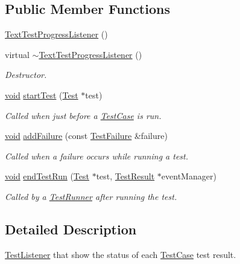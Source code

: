 \subsection*{Public Member Functions}
\begin{DoxyCompactItemize}
\item 
\hyperlink{class_text_test_progress_listener_aa63f5f3bc8a8dffef5c3d3e7dcad8355}{Text\-Test\-Progress\-Listener} ()
\item 
virtual \hyperlink{class_text_test_progress_listener_a28e80d641b47e53a73e896cce622a2fe}{$\sim$\-Text\-Test\-Progress\-Listener} ()
\begin{DoxyCompactList}\small\item\em Destructor. \end{DoxyCompactList}\item 
\hyperlink{wglew_8h_aeea6e3dfae3acf232096f57d2d57f084}{void} \hyperlink{class_text_test_progress_listener_ae5089aa6b0bcae0128604691f23ed224}{start\-Test} (\hyperlink{class_test}{Test} $\ast$test)
\begin{DoxyCompactList}\small\item\em Called when just before a \hyperlink{class_test_case}{Test\-Case} is run. \end{DoxyCompactList}\item 
\hyperlink{wglew_8h_aeea6e3dfae3acf232096f57d2d57f084}{void} \hyperlink{class_text_test_progress_listener_a66f5a921e6e3ceecc8a286df7b60abcf}{add\-Failure} (const \hyperlink{class_test_failure}{Test\-Failure} \&failure)
\begin{DoxyCompactList}\small\item\em Called when a failure occurs while running a test. \end{DoxyCompactList}\item 
\hyperlink{wglew_8h_aeea6e3dfae3acf232096f57d2d57f084}{void} \hyperlink{class_text_test_progress_listener_a12df92f16f1e2b9d571fd064fb7f30bd}{end\-Test\-Run} (\hyperlink{class_test}{Test} $\ast$test, \hyperlink{class_test_result}{Test\-Result} $\ast$event\-Manager)
\begin{DoxyCompactList}\small\item\em Called by a \hyperlink{class_test_runner}{Test\-Runner} after running the test. \end{DoxyCompactList}\end{DoxyCompactItemize}


\subsection{Detailed Description}
\hyperlink{class_test_listener}{Test\-Listener} that show the status of each \hyperlink{class_test_case}{Test\-Case} test result. 

